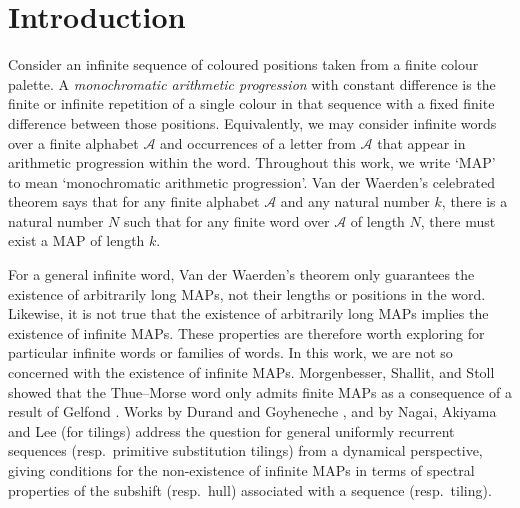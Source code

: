 \documentclass[10pt,a4paper,reqno]{amsart}
\begin{document}
\section{Introduction}
Consider an infinite sequence of coloured positions taken from a finite colour palette. A {\em monochromatic arithmetic progression} with constant difference is the finite or infinite repetition of a single colour in that sequence with a fixed finite difference between those positions. Equivalently, we may consider infinite words over a finite alphabet $\mathcal{A}$ and occurrences of a letter from $\mathcal{A}$ that appear in arithmetic progression within the word. Throughout this work, we write `MAP' to mean `monochromatic arithmetic progression'. Van der Waerden's celebrated theorem \cite{vdw1927} says that for any finite alphabet $\mathcal{A}$ and any natural number $k$, there is a natural number $N$ such that for any finite word over $\mathcal{A}$ of length $N$, there must exist a MAP of length $k$.

For a general infinite word, Van der Waerden's theorem only guarantees the existence of arbitrarily long MAPs, not their lengths or positions in the word. Likewise, it is not true that the existence of arbitrarily long MAPs implies the existence of infinite MAPs. These properties are therefore worth exploring for particular infinite words or families of words. In this work, we are not so concerned with the existence of infinite MAPs. Morgenbesser, Shallit, and Stoll \cite{mss2011} showed that the Thue--Morse word only admits finite MAPs as a consequence of a result of Gelfond \cite{gelfond68}. Works by Durand and Goyheneche \cite{dg2019}, and by Nagai, Akiyama and Lee \cite{nagai2022} (for tilings) address the question for general uniformly recurrent sequences (resp.\ primitive substitution tilings) from a dynamical perspective, giving conditions for the non-existence of infinite MAPs in terms of spectral properties of the subshift (resp.\ hull) associated with a sequence (resp.\ tiling).
\end{document}

